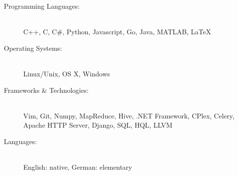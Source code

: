 \documentclass[11pt]{article}
\begin{document}
\begin{description}
    \item[Programming Languages:] \hfill \\
        {\small C++, C, C\#, Python, Javascript, Go, Java, MATLAB, \LaTeX}

    \item[Operating Systems:] \hfill \\
        {\small Linux/Unix, OS X, Windows}

    \item[Frameworks \& Technologies:] \hfill \\
        {\small
            Vim, Git, Numpy, MapReduce, Hive, .NET Framework, CPlex, Celery, 
            Apache HTTP Server, Django, SQL, HQL, LLVM
        }

    \item[Languages:] \hfill \\
        {\small English: native, German: elementary}

\end{description}
\end{document}
